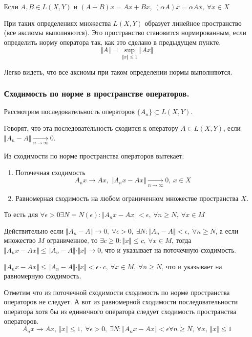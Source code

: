 \documentclass[14pt,a4paper]{extarticle}
\theoremstyle{definition}
\theoremstyle{remark}
\renewcommand{\[}{\begin{dmath*}[compact]}
\renewcommand{\]}{\end{dmath*}}
\newcommand{\be}{\begin{enumerate}}
\newcommand{\ee}{\end{enumerate}}
\newcommand{\sep}{ , \ \allowbreak }
\begin{document}
Если $A, B \in L(X,Y)$ и $(A+B)x = Ax + Bx \sep (\alpha A)x = \alpha Ax \sep
\forall x \in X$

При таких определениях множества $L(X,Y)$ образует линейное пространство
(все аксиомы выполняются). Это пространство становится нормированным, если
определить норму оператора так, как это сделано в предыдущем пункте.
\[\Vert A \Vert = \sup_{\Vert x \Vert \leq 1} \Vert Ax \Vert\]

Легко видеть, что все аксиомы при таком определении нормы выполняются.

\subsubsection{Сходимость по норме в пространстве операторов.}

Рассмотрим последовательность операторов $\{A_n\} \subset L(X,Y)$.

Говорят, что эта последовательность сходится к оператору $A \in L(X,Y)$, если
$\Vert A_n - A \Vert \underset{n \to \infty}{\to} 0$.

Из сходимости по норме пространства операторов вытекает:
\be
  \item Поточечная сходимость
  \[A_nx \to Ax \sep \Vert A_nx - Ax \Vert \underset{n \to \infty}{\to} 0 \sep
  x \in X\]

  \item Равномерная сходимость на любом ограниченном множестве пространства $X$.
\ee

То есть для $\forall \epsilon > 0 \exists N = N(\epsilon): \Vert A_nx-Ax \Vert
< \epsilon \sep \forall n \geq N \sep \forall x \in M$

Действительно если $\Vert A_n - A \Vert \to 0 \sep \forall \epsilon > 0 \sep
\exists N: \Vert A_n - A \Vert < \epsilon \sep \forall n \geq N$,
а если множество $M$ ограниченное, то $\exists c \geq 0: \Vert x \Vert \leq c
\sep \forall x \in M$, тогда $\Vert A_nx - Ax \Vert \leq \Vert A_n - A \Vert
\cdot \Vert x \Vert \to 0$, что и указывает на поточечную сходимость.

$\Vert A_nx - Ax \Vert \leq \Vert A_n-A \Vert \cdot \Vert x \Vert <
\epsilon \cdot c \sep \forall x \in M \sep \forall n \geq N$, что и указывает
на равномерную сходимость.

Отметим что из поточечной сходимости сходимость по норме пространства
операторов не следует. А вот из равномерной сходимости последовательности
оператора хотя бы из единичного оператора следует сходимость пространства
операторов.
\[A_nx \to Ax \sep \Vert x \Vert \leq 1 \sep \forall \epsilon > 0 \sep
\exists N : \Vert A_nx-Ax \Vert < \epsilon \forall n \geq N \sep
\forall x \sep \Vert x \Vert \leq 1\]
\end{document}
